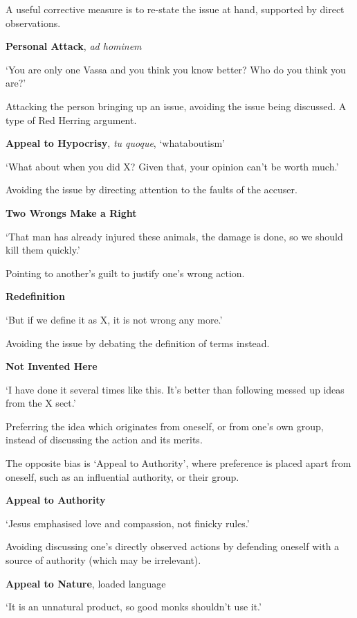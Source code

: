 A useful corrective measure is to re-state the issue at hand, supported
by direct observations.

\textbf{Personal Attack}, \emph{ad hominem}

`You are only one Vassa and you think you know better? Who do you think
you are?'

Attacking the person bringing up an issue, avoiding the issue being
discussed. A type of Red Herring argument.

\textbf{Appeal to Hypocrisy}, \emph{tu quoque}, `whataboutism'

`What about when you did X? Given that, your opinion can't be worth
much.'

Avoiding the issue by directing attention to the faults of the accuser.

\textbf{Two Wrongs Make a Right}

`That man has already injured these animals, the damage is done, so we
should kill them quickly.'

Pointing to another's guilt to justify one's wrong action.

\textbf{Redefinition}

`But if we define it as X, it is not wrong any more.'

Avoiding the issue by debating the definition of terms instead.

\textbf{Not Invented Here}

\enlargethispage*{2\baselineskip}

`I have done it several times like this. It's better than following
messed up ideas from the X sect.'

Preferring the idea which originates from oneself, or from one's own
group, instead of discussing the action and its merits.

The opposite bias is `Appeal to Authority', where preference is placed
apart from oneself, such as an influential authority, or their group.

\clearpage

\textbf{Appeal to Authority}

`Jesus emphasised love and compassion, not finicky rules.'

Avoiding discussing one's directly observed actions by defending oneself
with a source of authority (which may be irrelevant).

\textbf{Appeal to Nature}, loaded language

`It is an unnatural product, so good monks shouldn't use it.'

